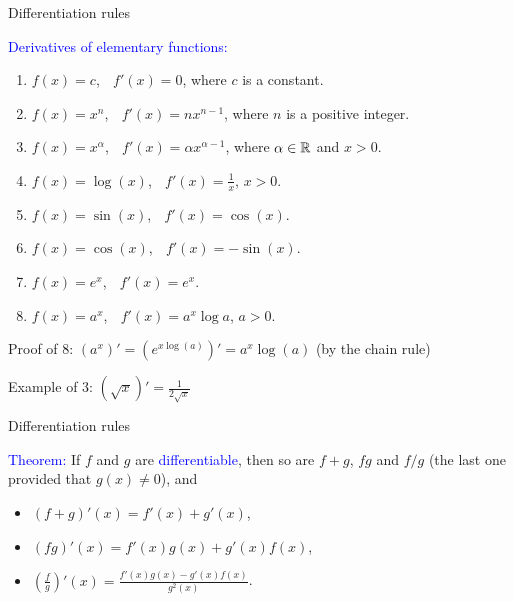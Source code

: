 \documentclass[11pt,aspectratio=169]{beamer}
\begin{document}
\begin{frame}{Differentiation rules}

\textcolor{blue}{Derivatives of elementary functions:}
\begin{enumerate}
\item $f(x)=c$, $\;$ $f'(x)=0$, where $c$ is a constant.
\item $f(x)=x^n$, $\;$ $f'(x)=nx^{n-1}$, where $n$ is a positive  integer.
\item $f(x)=x^{\alpha}$, $\;$ $f'(x)=\alpha x^{\alpha-1}$, where $\alpha \in \mathbb R$ and $x>0$.
\item $f(x)=\log(x)$, $\;$ $f'(x)=\frac{1}{x}$, $x>0$.
\item $f(x)=\sin(x)$, $\;$ $f'(x)=\cos(x)$.
\item $f(x)=\cos(x)$, $\;$ $f'(x)=-\sin(x)$.
\item $f(x)=e^x$, $\;$ $f'(x)=e^x$.
\item $f(x)=a^x$, $\;$ $f'(x)=a^x \log a$, $a>0$.
\end{enumerate}

\begin{tiny}Proof of 8: $(a^x)'=(e^{x\log(a)})'=a^x \log(a)$ (by the chain rule)\end{tiny}

\begin{tiny} Example of 3: $(\sqrt{x})'=\frac{1}{2\sqrt{x}}$ \end{tiny}
\end{frame}



\begin{frame}{Differentiation rules}




\textcolor{blue}{Theorem:} If $f$ and $g$ are \textcolor{blue}{differentiable}, then so are $f+g$,
$fg$ and $f/g$ (the last one provided that $g(x) \neq 0$), and

\begin{itemize}
\item $(f+g)'(x)=f'(x)+g'(x)$,
\item $(fg)'(x)=f'(x)g(x)+g'(x)f(x)$,
\item $\left(\frac{f}{g}\right)'(x)=\frac{f'(x) g(x)-g'(x)f(x)}{g^2(x)}$.
\end{itemize}
\end{frame}
\end{document}
